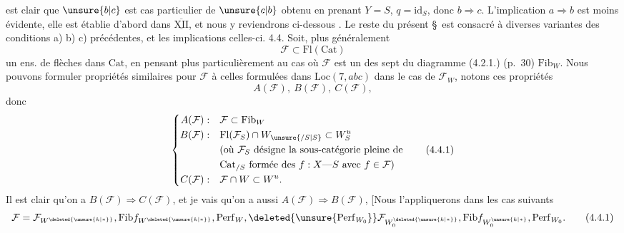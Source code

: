  est clair que $\unsure{b|c}$ est  cas particulier
de $\unsure{c|b}$ obtenu en prenant $Y=S$, $q=\mathrm{id}_S$,
donc $b\Longrightarrow c$. L'implication $a\Longrightarrow b$ est
moins évidente, elle est établie d'abord dans
$\overline{\underline{\mathrm{XII}}}$, et nous y reviendrons ci-dessous .
Le reste du présent \S\ est consacré à  
diverses variantes des conditions a) b) c)
précédentes, et les implications  celles-ci.
4.4. Soit, plus généralement
\[
\mathcal F\subset\mathrm{Fl}(\mathrm{Cat})
\]
un ens. de flèches dans $\mathrm{Cat}$, en pensant
plus particulièrement au cas où $\mathcal F$ est un
des sept   du diagramme
(4.2.1.) (p.~30)   $\mathrm{Fib}_W$.
 Nous
pouvons formuler   propriétés similaires
pour $\mathcal F$ à celles formulées dans $\mathrm{Loc}(7,abc)$
dans le cas de $\mathcal F_W$, notons ces
propriétés
\[
A(\mathcal F),\ B(\mathcal F),\ C(\mathcal F),
\]
donc
\[
\left\{\begin{aligned}
A(\mathcal F):&\quad\mathcal F\subset\mathrm{Fib}_W\\
B(\mathcal F):&\quad\mathrm{Fl}(\mathcal F_S)\cap W_{\unsure{/S|S}}\subset W_S^u\\
&\quad\text{(où $\mathcal F_S$ désigne la sous-catégorie pleine de}\\
&\quad\text{$\mathrm{Cat}_{/S}$ formée des $f:X\text{---}S$ avec $f\in\mathcal F$)}\\
C(\mathcal F):&\quad\mathcal F\cap W\subset W^u.
\end{aligned}\right.
\tag*{(4.4.1)}
\]
Il est clair qu'on a $B(\mathcal F)\Longrightarrow C(\mathcal F)$, et je
vais  %
\uline{} qu'on a aussi $A(\mathcal F)\Longrightarrow B(\mathcal F)$,
[Nous l'appliquerons dans les cas suivants
\[
\mathcal F=\mathcal F_{W^{\deleted{\unsure{k|*}}}},\mathrm{Fib}f_{W^{\deleted{\unsure{k|*}}}},\mathrm{Perf}_W,
\deleted{\unsure{\mathrm{Perf}_{W_0}}}\mathcal F_{W_0^{\deleted{\unsure{k|*}}}},
\mathrm{Fib}f_{W_0^{\unsure{k|*}}},\mathrm{Perf}_{W_0}.
\tag*{(4.4.1)}
\]
